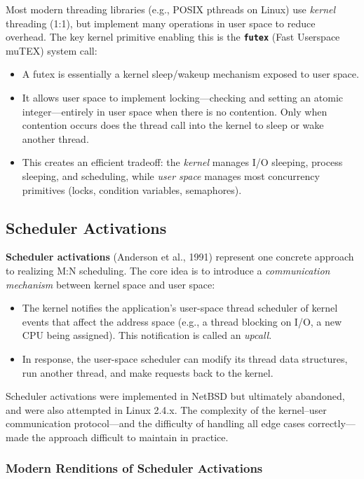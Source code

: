 \documentclass[11pt]{article}
\begin{document}
Most modern threading libraries (e.g., POSIX pthreads on Linux) use \emph{kernel} threading (1:1), but implement many operations in user space to reduce overhead. The key kernel primitive enabling this is the \textbf{\texttt{futex}} (Fast Userspace muTEX) system call:

\begin{itemize}
    \item A futex is essentially a kernel sleep/wakeup mechanism exposed to user space.
    \item It allows user space to implement locking---checking and setting an atomic integer---entirely in user space when there is no contention. Only when contention occurs does the thread call into the kernel to sleep or wake another thread.
    \item This creates an efficient tradeoff: the \emph{kernel} manages I/O sleeping, process sleeping, and scheduling, while \emph{user space} manages most concurrency primitives (locks, condition variables, semaphores).
\end{itemize}

\subsection{Scheduler Activations}

\textbf{Scheduler activations} (Anderson et al., 1991) represent one concrete approach to realizing M:N scheduling. The core idea is to introduce a \emph{communication mechanism} between kernel space and user space:

\begin{itemize}
    \item The kernel notifies the application's user-space thread scheduler of kernel events that affect the address space (e.g., a thread blocking on I/O, a new CPU being assigned). This notification is called an \emph{upcall}.
    \item In response, the user-space scheduler can modify its thread data structures, run another thread, and make requests back to the kernel.
\end{itemize}

Scheduler activations were implemented in NetBSD but ultimately abandoned, and were also attempted in Linux 2.4.x. The complexity of the kernel--user communication protocol---and the difficulty of handling all edge cases correctly---made the approach difficult to maintain in practice.

\subsubsection*{Modern Renditions of Scheduler Activations}
\end{document}
